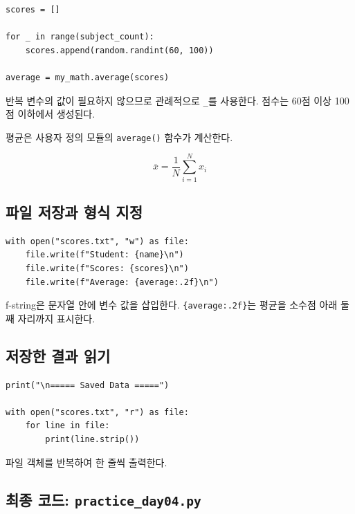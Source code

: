 \documentclass[11pt,a4paper]{article}
\begin{document}
\begin{lstlisting}
scores = []

for _ in range(subject_count):
    scores.append(random.randint(60, 100))

average = my_math.average(scores)
\end{lstlisting}

반복 변수의 값이 필요하지 않으므로 관례적으로 \texttt{\_}를 사용한다. 점수는 60점 이상 100점 이하에서 생성된다.

평균은 사용자 정의 모듈의 \texttt{average()} 함수가 계산한다.

\[
\overline{x}=\frac{1}{N}\sum_{i=1}^{N}x_i
\]

\subsection{파일 저장과 형식 지정}

\begin{lstlisting}
with open("scores.txt", "w") as file:
    file.write(f"Student: {name}\n")
    file.write(f"Scores: {scores}\n")
    file.write(f"Average: {average:.2f}\n")
\end{lstlisting}

f-string은 문자열 안에 변수 값을 삽입한다. \texttt{\{average:.2f\}}는 평균을 소수점 아래 둘째 자리까지 표시한다.

\subsection{저장한 결과 읽기}

\begin{lstlisting}
print("\n===== Saved Data =====")

with open("scores.txt", "r") as file:
    for line in file:
        print(line.strip())
\end{lstlisting}

파일 객체를 반복하여 한 줄씩 출력한다.

\subsection{최종 코드: \texttt{practice\_day04.py}}
\end{document}
